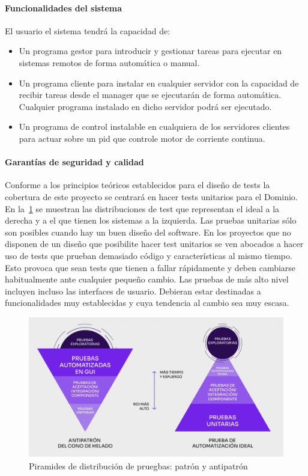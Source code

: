\paragraph{Funcionalidades del sistema}

El usuario el sistema tendrá la capacidad de:

\begin{itemize}
    \item Un programa gestor para introducir y gestionar tareas para ejecutar en sistemas remotos de forma automática o manual.
    \item Un programa cliente para instalar en cualquier servidor con la capacidad de recibir tareas desde el manager que se ejecutarán de forma automática.
    Cualquier programa instalado en dicho servidor podrá ser ejecutado.
    \item Un programa de control instalable en cualquiera de los servidores clientes para actuar sobre un pid que controle motor de corriente continua.
\end{itemize}

\paragraph{Garantías de seguridad y calidad}\label{par:testing}
    Conforme a los principios teóricos establecidos para el diseño de tests la cobertura de este proyecto se centrará en hacer tests unitarios para el Dominio.
    En la~\cref{fig:piramidTest} se muestran las distribuciones de test que representan el ideal a la derecha y a el que tienen los sistemas a la izquierda.
    Las pruebas unitarias sólo son posibles cuando hay un buen diseño del software.
    En los proyectos que no disponen de un diseño que posibilite hacer test unitarios se ven abocados a hacer uso de tests que prueban demasiado código y características al mismo tiempo.
    Esto provoca que sean tests que tienen a fallar rápidamente y deben cambiarse habitualmente ante cualquier pequeño cambio.
    Las pruebas de más alto nivel incluyen incluso las interfaces de usuario.
    Debieran estar destinadas a funcionalidades muy establecidas y cuya tendencia al cambio sea muy escasa.

    \begin{figure}[H]
        \centering
        \includegraphics[height=0.35\textheight]{./part/Proyecto_ejecutivo/memoria_descriptiva/prestaciones/TestPiramid}
        \caption{Piramides de distribución de pruegbas: patrón y antipatrón}\label{fig:piramidTest}
    \end{figure}

